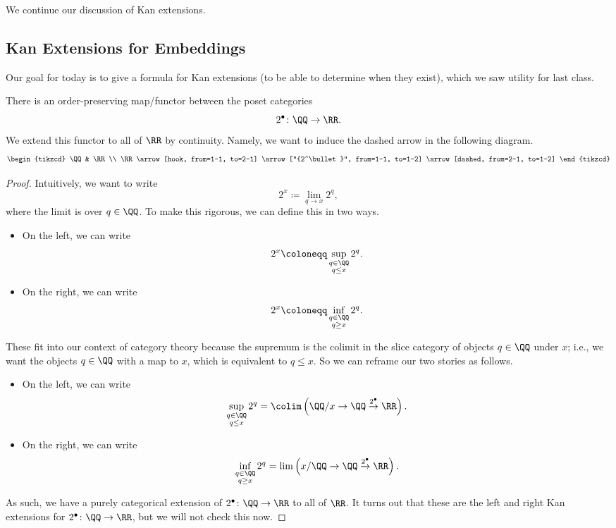 
We continue our discussion of Kan extensions.

\subsection{Kan Extensions for Embeddings}
Our goal for today is to give a formula for Kan extensions (to be able to determine when they exist), which we saw utility for last class.
\begin{exe}
	There is an order-preserving map/functor between the poset categories
	\[2^\bullet\colon\QQ\to\RR.\]
	We extend this functor to all of $\RR$ by continuity. Namely, we want to induce the dashed arrow in the following diagram.
	\[\begin{tikzcd}
		\QQ & \RR \\
		\RR
		\arrow[hook, from=1-1, to=2-1]
		\arrow["{2^\bullet}", from=1-1, to=1-2]
		\arrow[dashed, from=2-1, to=1-2]
	\end{tikzcd}\]
\end{exe}
\begin{proof}
	Intuitively, we want to write
	\[2^x\coloneqq\lim_{q\to x}2^q,\]
	where the limit is over $q\in\QQ$. To make this rigorous, we can define this in two ways.
	\begin{itemize}
		\item On the left, we can write
		\[2^x\coloneqq\sup_{\substack{q\in\QQ\\q\le x}}2^q.\]
		\item On the right, we can write
		\[2^x\coloneqq\inf_{\substack{q\in\QQ\\q\ge x}}2^q.\]
	\end{itemize}
	These fit into our context of category theory because the supremum is the colimit in the slice category of objects $q\in\QQ$ under $x$; i.e., we want the objects $q\in\QQ$ with a map to $x$, which is equivalent to $q\le x$. So we can reframe our two stories as follows.
	\begin{itemize}
		\item On the left, we can write
		\[\sup_{\substack{q\in\QQ\\q\le x}}2^q=\colim\left(\QQ/x\to\QQ\stackrel{2^\bullet}\to\RR\right).\]
		\item On the right, we can write
		\[\inf_{\substack{q\in\QQ\\q\ge x}}2^q=\lim\left(x/\QQ\to\QQ\stackrel{2^\bullet}\to\RR\right).\]
	\end{itemize}
	As such, we have a purely categorical extension of $2^\bullet\colon\QQ\to\RR$ to all of $\RR$. It turns out that these are the left and right Kan extensions for $2^\bullet\colon\QQ\to\RR$, but we will not check this now.
\end{proof}
